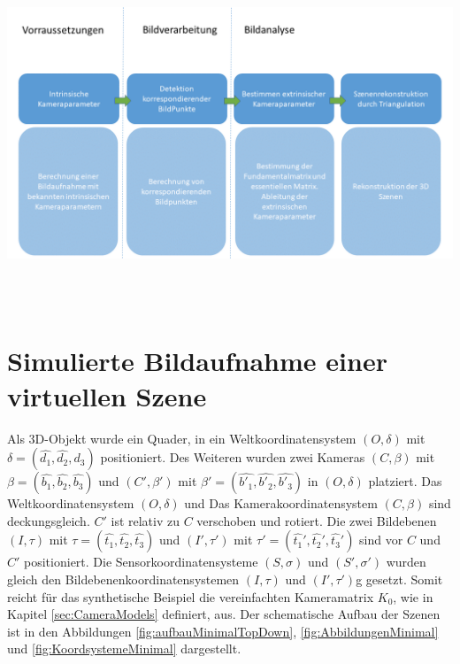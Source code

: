 \begin{minipage}{\linewidth}
	\centering
	\includegraphics[width=1.\linewidth]{images/NEU_Virtuel_Arbeitsprozess.png}
	\label{fig:ArbeitsProzessVirtuell}
\end{minipage}\\ \\

%



\section{Simulierte Bildaufnahme einer virtuellen Szene}

Als 3D-Objekt wurde ein Quader, in ein Weltkoordinatensystem $(O,\delta)$ mit $\delta = (\hat{d_1},\hat{d_2},\hat{d_3})$ positioniert. Des Weiteren wurden zwei Kameras $(C,\beta)$ mit $\beta = (\hat{b_1},\hat{b_2},\hat{b_3})$ und $(C',\beta')$ mit $\beta' = (\hat{b'_1},\hat{b'_2},\hat{b'_3})$ in $(O,\delta)$ platziert. Das Weltkoordinatensystem $(O,\delta)$ und Das Kamerakoordinatensystem $(C,\beta)$ sind deckungsgleich. $C'$ ist relativ zu $C$ verschoben und rotiert. Die zwei Bildebenen $(I,\tau)$ mit $\tau = (\hat{t_1},\hat{t_2},\hat{t_3})$ und $(I',\tau')$ mit $\tau' = (\hat{t_1}',\hat{t_2}',\hat{t_3}')$ sind vor $C$ und $C'$ positioniert. Die Sensorkoordinatensysteme $(S,\sigma)$ und $(S',\sigma')$ wurden gleich den Bildebenenkoordinatensystemen $(I,\tau)$ und $(I',\tau')$g gesetzt. Somit reicht für das synthetische Beispiel die vereinfachten Kameramatrix $K_0$, wie in Kapitel \ref{sec:CameraModels} definiert, aus. Der schematische Aufbau der Szenen ist in den Abbildungen \ref{fig:aufbauMinimalTopDown}, \ref{fig:AbbildungenMinimal} und \ref{fig:KoordsystemeMinimal} dargestellt.


